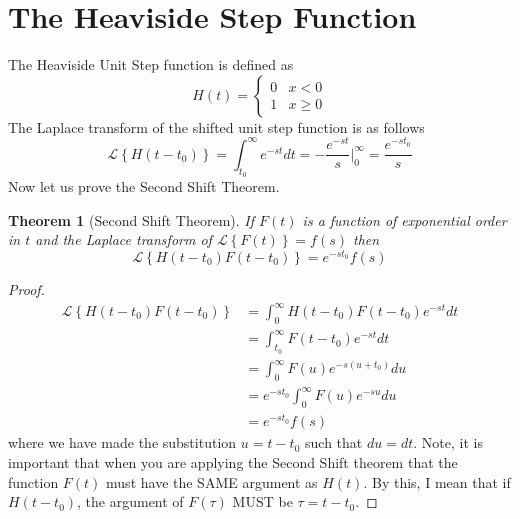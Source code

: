 \documentclass{report}
\newtheorem{theorem}{Theorem}[chapter]
\theoremstyle{definition}
\theoremstyle{remark}
\newcommand{\lapt}[1]{\mathscr{L}\left\{ #1\right\}}
\begin{document}
\section{The Heaviside Step Function}
The Heaviside Unit Step function is defined as 
\begin{equation*}
    H(t) = \begin{cases}
        0 &x< 0 \\
        1 &x\geq 0
    \end{cases}
\end{equation*}
The Laplace transform of the shifted unit step function is as follows 
\begin{equation*}
    \lapt{H(t-t_0)} = \int^\infty_{t_0} e^{-st}dt = -\frac{e^{-st}}{s} \Bigg|^\infty_0 = \frac{e^{-st_0}}{s}
\end{equation*}
Now let us prove the Second Shift Theorem.
\begin{theorem} [Second Shift Theorem]
    If $F(t)$ is a function of exponential order in $t$ and the Laplace transform of $\lapt{F(t)} = f(s)$ then 
    \begin{equation*}
        \lapt{H(t-t_0)F(t-t_0)} = e^{-st_0}f(s) \label{theo:sst}
    \end{equation*}
\end{theorem}
\begin{proof}
    \begin{equation*}
        \begin{split}
            \lapt{H(t-t_0)F(t-t_0)} &= \int^\infty_0H(t-t_0)F(t-t_0)e^{-st}dt \\
            &= \int^\infty_{t_0} F(t-t_0)e^{-st} dt \\
            & = \int^\infty_0 F(u) e^{-s(u+t_0)}du \\ 
            &= e^{-st_0}\int^\infty_0F(u) e^{-su} du \\
            &= e^{-st_0}f(s)
        \end{split}
    \end{equation*}
    where we have made the substitution $u=t-t_0$ such that $du = dt$. Note, it is important that when you are applying the Second Shift theorem that the function $F(t)$ must have the SAME argument as $H(t)$. By this, I mean that if $H(t-t_0)$, the argument of $F(\tau)$ MUST be $\tau =t-t_0$.
\end{proof}
\end{document}
